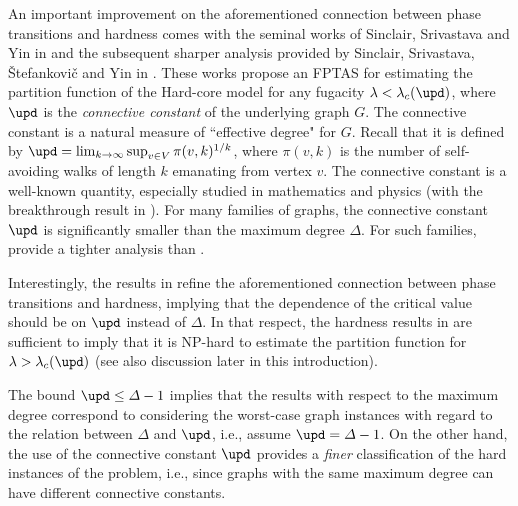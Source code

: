\documentclass[11pt,reqno]{amsart}
\numberwithin{equation}{section}
\newcommand{\blue}[1]{{\color{blue}#1}}
\newcommand{\bluepigment}[1]{{\color{blue(pigment)}#1}}
\newcommand{\electricviolet}[1]{{\color{electricviolet}#1}}
\newcommand{\goldenbrown}[1]{{\color{goldenbrown}#1}}
\newcommand{\maxDeg}{{\Delta}}
\newcommand{\cconnective}{\goldenbrown{\upd}}
\newcommand{\lcritical}{{\lambda_c}}
\renewcommand{\blue}[1]{#1}
\renewcommand{\bluepigment}[1]{#1}
\renewcommand{\electricviolet}[1]{#1}
\renewcommand{\goldenbrown}[1]{#1}
\newcommand{\kk}{\bluepigment{k}}
\newcommand{\kv}{\electricviolet{v}}
\renewcommand{\kk}{k}
\renewcommand{\kv}{v}
\begin{document}
An important improvement on the aforementioned connection between phase transitions and hardness comes with the seminal 
works of Sinclair, Srivastava and  Yin in \cite{ConnectiveConstFirst} and the subsequent sharper analysis  provided by Sinclair, Srivastava, \v Stefankovi\v c 
and Yin in \cite{ConnectiveConst}. These works  propose an FPTAS for estimating the partition function  of the Hard-core 
model for any fugacity  $\lambda<\lcritical(\cconnective)$, where $\cconnective$ is the {\em connective constant} of the 
underlying graph $G$. The connective constant is a natural measure of  ``effective degree" for   $G$.  Recall that 
it  is defined by $\cconnective = \lim_{\kk\to \infty}\sup_{\kv\in V} \pi(\kv,\kk)^{1/\kk}$, where 
$\pi(\kv,\kk)$ is the number of self-avoiding walks of length $\kk$ emanating from vertex $\kv$.  The connective constant is  
a well-known quantity, especially  studied in mathematics and physics (with the breakthrough result in \cite{HoneycombCC}).
\blue{For many  families of graphs, the connective constant $\cconnective$ is significantly smaller than 
the maximum degree $\maxDeg$. For such families,  \cite{ConnectiveConstFirst,ConnectiveConst} 
provide a tighter analysis than  \cite{Weitz}. }



Interestingly, the results in \cite{ConnectiveConstFirst,ConnectiveConst}  refine the aforementioned connection between phase transitions 
and hardness,  implying  that the dependence of the critical value should be  on $\cconnective$ instead of  $\maxDeg$. 
% 
In that respect, the hardness results in \cite{SS14,GSV16Hardness} are sufficient to imply that it is NP-hard to estimate the partition function for 
$\lambda>\lcritical(\cconnective)$ (see also discussion later in this introduction).

The  bound $\cconnective\leq \maxDeg-1$ implies that the results with respect to the maximum degree  
correspond to considering the worst-case graph instances with regard to the relation between $\maxDeg$ and 
$\cconnective$, i.e., assume $\cconnective=\maxDeg-1$. On the other hand, the use of the connective constant $\cconnective$ 
provides a {\em finer} classification of the hard instances of the problem, i.e.,  since  graphs with the same maximum degree 
can have different connective constants. 



%
\end{document}
